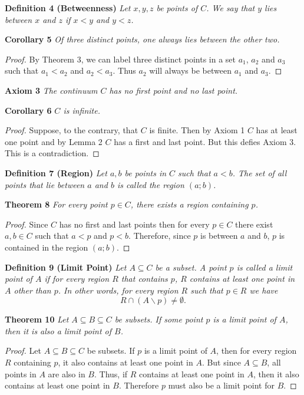 \documentclass{article}
\begin{document}
\begin{flushleft}
\textbf{Definition 4 (Betweenness)}
\textsl{Let $x,y,z$ be points of $C$. We say that $y$ lies between $x$ and $z$ if $x<y$ and $y<z$.}\newline

\textbf{Corollary 5}
\textsl{Of three distinct points, one always lies between the other two.}
\begin{proof}
By Theorem 3, we can label three distinct points in a set $a_1$, $a_2$ and $a_3$ such that $a_1 < a_2$ and $a_2 < a_3$. Thus $a_2$ will always be between $a_1$ and $a_3$.
\end{proof}

\textbf{Axiom 3}
\textsl{The continuum $C$ has no first point and no last point.}\newline

\textbf{Corollary 6}
\textsl{$C$ is infinite.}
\begin{proof}
Suppose, to the contrary, that $C$ is finite. Then by Axiom 1 $C$ has at least one point and by Lemma 2 $C$ has a first and last point. But this defies Axiom 3. This is a contradiction.
\end{proof}

\textbf{Definition 7 (Region)}
\textsl{Let $a,b$ be points in $C$ such that $a<b$. The set of all points that lie between $a$ and $b$ is called the region $(a;b)$.}\newline

\textbf{Theorem 8}
\textsl{For every point $p \in C$, there exists a region containing $p$.}
\begin{proof}
Since $C$ has no first and last points then for every $p \in C$ there exist $a,b \in C$ such that $a < p$ and $p < b$. Therefore, since $p$ is between $a$ and $b$, $p$ is contained in the region $(a;b)$.
\end{proof}

\textbf{Definition 9 (Limit Point)}
\textsl{Let $A \subseteq C$ be a subset. A point $p$ is called a limit point of $A$ if for every region $R$ that contains $p$, $R$ contains at least one point in $A$ other than $p$. In other words, for every region $R$ such that $p \in R$ we have
\[
R \cap (A \backslash p) \neq \emptyset.
\]}

\textbf{Theorem 10}
\textsl{Let $A \subseteq B \subseteq C$ be subsets. If some point $p$ is a limit point of $A$, then it is also a limit point of $B$.}
\begin{proof}
Let $A \subseteq B \subseteq C$ be subsets. If $p$ is a limit point of $A$, then for every region $R$ containing $p$, it also contains at least one point in $A$. But since $A \subseteq B$, all points in $A$ are also in $B$. Thus, if $R$ contains at least one point in $A$, then it also contains at least one point in $B$. Therefore $p$ must also be a limit point for $B$.
\end{proof}


\end{flushleft}
\end{document}
